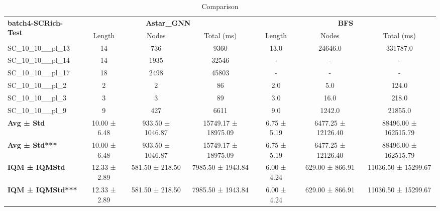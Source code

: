 \begin{table}[!ht]
\centering
\small
\begin{tabular}{l|ccc|ccc}
\multirow{2}{*}{\textbf{batch4-SCRich-Test}} & \multicolumn{3}{c|}{\textbf{Astar\_GNN}} & \multicolumn{3}{c}{\textbf{BFS}} \\
\cline{2-7}
& Length & Nodes & Total (ms) & Length & Nodes & Total (ms) \\
\hline
SC\_10\_10\_\_pl\_13 & 14 & 736 & 9360 & 13.0 & 24646.0 & 331787.0 \\
SC\_10\_10\_\_pl\_14 & 14 & 1935 & 32546 & - & - & - \\
SC\_10\_10\_\_pl\_17 & 18 & 2498 & 45803 & - & - & - \\
SC\_10\_10\_\_pl\_2 & 2 & 2 & 86 & 2.0 & 5.0 & 124.0 \\
SC\_10\_10\_\_pl\_3 & 3 & 3 & 89 & 3.0 & 16.0 & 218.0 \\
SC\_10\_10\_\_pl\_9 & 9 & 427 & 6611 & 9.0 & 1242.0 & 21855.0 \\
\hline
\textbf{Avg ± Std} & 10.00 ± 6.48 & 933.50 ± 1046.87 & 15749.17 ± 18975.09 & 6.75 ± 5.19 & 6477.25 ± 12126.40 & 88496.00 ± 162515.79 \\
\textbf{Avg ± Std***} & 10.00 ± 6.48 & 933.50 ± 1046.87 & 15749.17 ± 18975.09 & 6.75 ± 5.19 & 6477.25 ± 12126.40 & 88496.00 ± 162515.79 \\
\textbf{IQM ± IQMStd} & 12.33 ± 2.89 & 581.50 ± 218.50 & 7985.50 ± 1943.84 & 6.00 ± 4.24 & 629.00 ± 866.91 & 11036.50 ± 15299.67 \\
\textbf{IQM ± IQMStd***} & 12.33 ± 2.89 & 581.50 ± 218.50 & 7985.50 ± 1943.84 & 6.00 ± 4.24 & 629.00 ± 866.91 & 11036.50 ± 15299.67 \\
\end{tabular}
\caption{Comparison}
\label{tab:batch4_SCRich_comparison_test}
\end{table}
